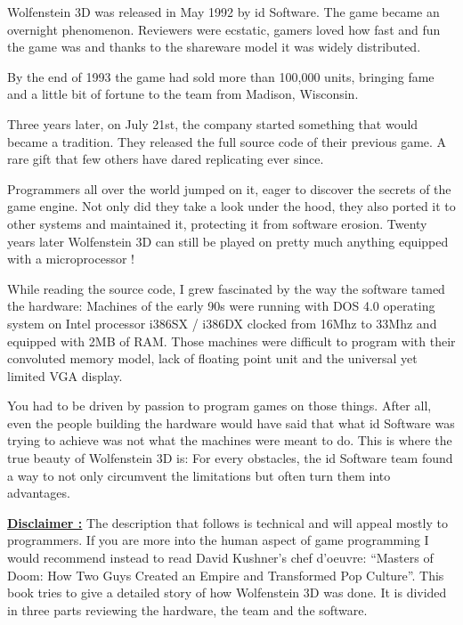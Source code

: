 Wolfenstein 3D was released in May 1992 by id Software. The game  became an overnight phenomenon. Reviewers were ecstatic, gamers loved how fast and fun the game was and thanks to the shareware model it was widely distributed.

\bigskip

By the end of 1993 the game had sold more than 100,000 units, bringing fame and a little bit of fortune to the team from Madison, Wisconsin.

\bigskip

Three years later, on July 21st, the company started something that would became a tradition. They released the full source code of their previous game. A rare gift that few others have dared replicating ever since.

\bigskip

Programmers all over the world jumped on it, eager to discover the secrets of the game engine. Not only did they take a look under the hood, they also ported it to other systems and maintained it, protecting it from software erosion. Twenty years later Wolfenstein 3D can still be played on pretty much anything equipped with a microprocessor !

\bigskip

While reading the source code, I grew fascinated by the way the software tamed the hardware:  Machines of the early 90s were running with DOS 4.0 operating system on Intel processor i386SX / i386DX clocked from 16Mhz to 33Mhz and equipped with 2MB of RAM. Those machines were difficult to program with their convoluted memory model, lack of floating point unit and the universal yet limited VGA display. 

\bigskip

You had to be driven by passion to program games on those things. After all, even the people building the hardware would have said that what id Software was trying to achieve was not what the machines were meant to do. This is where the true beauty of Wolfenstein 3D is: For every obstacles, the id Software team found a way to not only circumvent the limitations but often turn them into advantages.

\bigskip

 \textbf{\underline{Disclaimer :}} The description that follows is technical and will appeal mostly to programmers. If you are more into the human aspect of game programming I would recommend instead to read David Kushner’s chef d’oeuvre: “Masters of Doom: How Two Guys Created an Empire and Transformed Pop Culture”.
This book tries to give a detailed story of how Wolfenstein 3D was done. It is divided in three parts reviewing the hardware, the team and the software.